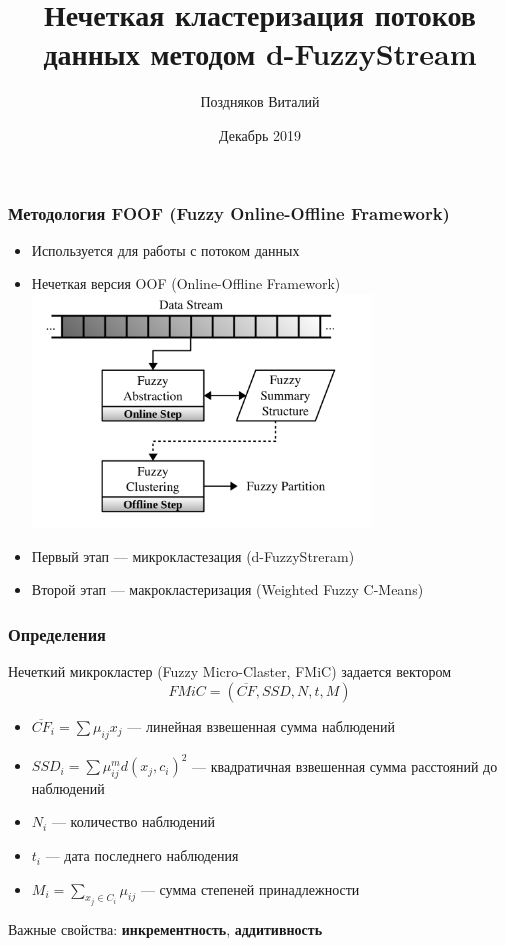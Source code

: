 \documentclass{beamer}
\title{Нечеткая кластеризация потоков данных методом d-FuzzyStream}
\institute{Высшая школа экономики}
\author{Поздняков Виталий}
\date{Декабрь 2019}
\begin{document}
\maketitle

\begin{frame}
    \frametitle{Методология FOOF (Fuzzy Online-Offline Framework)}
    \begin{itemize}
        \item Используется для работы с потоком данных
        \item Нечеткая версия OOF (Online-Offline Framework)
        \includegraphics[width=9cm]{2019-12-18_15-01-09.png}
        \item Первый этап --- микрокластезация (d-FuzzyStreram)
        \item Второй этап --- макрокластеризация (Weighted Fuzzy C-Means)
    \end{itemize}
\end{frame}

\begin{frame}
    \frametitle{Определения}
    
    Нечеткий микрокластер (Fuzzy Micro-Claster, FMiC)  задается вектором
    $$FMiC = (\overline{CF}, SSD, N, t, M)$$
    \begin{itemize}
        \item $\overline{CF}_i = \sum \mu_{ij} x_j$ --- линейная взвешенная сумма наблюдений
        \item $SSD_i = \sum \mu_{ij}^m d(x_j, c_i)^2$ --- квадратичная взвешенная сумма расстояний до наблюдений
        \item $N_i$ --- количество наблюдений
        \item $t_i$ --- дата последнего наблюдения
        \item $M_i = \sum_{x_j \in C_i} \mu_{ij}$ --- сумма степеней принадлежности
    \end{itemize}
    Важные свойства: \textbf{инкрементность}, \textbf{аддитивность}
    
\end{frame}
\end{document}
